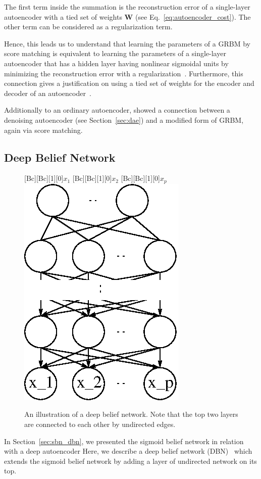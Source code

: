 \documentclass{now}
\newcommand{\matr}[1]{\mathbf{#1}}
\newcommand{\mW}[0]{\matr{W}}
\begin{document}
The first term inside the summation is the reconstruction error of a
single-layer autoencoder with a tied set of weights $\mW$ (see
Eq.~\eqref{eq:autoencoder_cost}). The other term can be considered as a
regularization term.

Hence, this leads us to understand that learning the parameters of a GRBM by
score matching is equivalent to learning the parameters of a single-layer
autoencoder that has a hidden layer having nonlinear sigmoidal units by
minimizing the reconstruction error with a regularization~\citep{Swersky2011}.
Furthermore, this connection gives a justification on using a tied set of
weights for the encoder and decoder of an autoencoder~\citep{Vincent2011}.

Additionally to an ordinary autoencoder, \citet{Vincent2011} showed a connection
between a denoising autoencoder (see Section~\ref{sec:dae}) and a modified form
of GRBM, again via score matching. 


\subsection{Deep Belief Network}
\label{sec:dbn}

\begin{figure}
    \centering
    [Bc][Bc][1][0]{$x_1$}
    [Bc][Bc][1][0]{$x_2$}
    [Bc][Bc][1][0]{$x_p$}
    \includegraphics[width=0.27\columnwidth]{../figures/dbn.eps}
    \caption{An illustration of a deep belief network. Note that the top two
        layers are connected to each other by undirected edges.}
    \label{fig:dbn}
    \vspace{-2mm}
\end{figure}

In Section~\ref{sec:sbn_dbn}, we presented the sigmoid belief network in
relation with a deep autoencoder Here, we describe a deep belief network
(DBN)~\citep{Hinton2006nc} which extends
the sigmoid belief network by adding a layer of undirected network on its top. 
\end{document}
